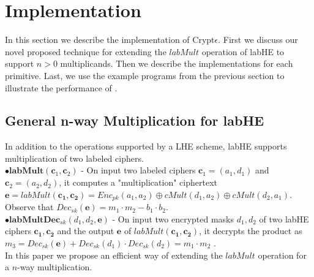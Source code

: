 \section{Implementation}\label{sec:implementaion}
\label{implementation}
In this section we describe the implementation of Crypt$\epsilon$. First we discuss our novel proposed technique for extending the $labMult$ operation of \textsf{labHE} to support $n > 0$ multiplicands. Then we describe the implementations for each primitive. Last, we use the example programs from the previous section to illustrate the performance of \system.

\subsection{\textbf{General n-way Multiplication for \textsf{labHE}}}\label{genlab}
In addition to the operations supported by a \textsf{LHE}  scheme, \textsf{labHE} supports multiplication of two labeled ciphers. 
\\ $\bullet \textbf{labMult}(\mathbf{c}_1,\mathbf{c}_2)$ -
On input two labeled ciphers $\mathbf{c}_1=(a_1,d_1)$ and $\mathbf{c}_2=(a_2,d_2)$, it computes a "multiplication" ciphertext $\mathbf{e}=labMult(\mathbf{c_1,c_2})=Enc_{pk}(a_1,a_2)\oplus cMult(d_1,a_2) \oplus cMult(d_2,a_1)$. Observe that $Dec_{sk}(\mathbf{e})=m_1\cdot m_2 -b_1 \cdot b_2$.\\
 $\bullet \textbf{labMultDec}_{sk}(d_1,d_2,\mathbf{e})$ - On input two encrypted masks $d_1,d_2$ of two labHE ciphers $\mathbf{c_1},\mathbf{c_2}$ and the output $\mathbf{e}$ of $labMult(\mathbf{c_1},\mathbf{c_2})$, it decrypts the product as $m_3=Dec_{sk}(\mathbf{e})+Dec_{sk}(d_1)\cdot Dec_{sk}(d_2) = m_1\cdot m_2$ .   \\
In this paper we propose an efficient way of extending the $labMult$ operation for a $n$-way multiplication.
